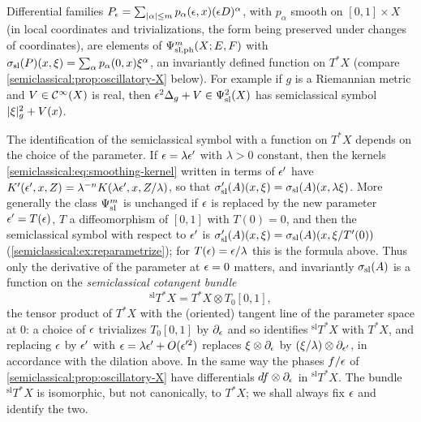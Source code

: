 Differential families
$P_\epsilon=\sum_{\lvert \alpha\rvert\le m}p_\alpha(\epsilon,x)(\epsilon D)^\alpha$, with $p_\alpha$ smooth
on $[0,1]\times X$ (in local coordinates and trivializations, the form being
preserved under changes of coordinates), are elements of $\Psi^{m}_{\mathrm{sl,ph}}(X;E,F)$
with $\sigma_{\mathrm{sl}}(P)(x,\xi)=\sum_\alpha p_\alpha(0,x)\xi^\alpha$, an invariantly defined
function on $T^*X$ (compare \cref{semiclassical:prop:oscillatory-X} below). For
example if $g$ is a Riemannian metric and $V\in\mathcal{C}^\infty(X)$ is real, then
$\epsilon^2\Delta_g+V\in\Psi^{2}_{\mathrm{sl}}(X)$ has semiclassical symbol $\lvert \xi\rvert^2_g+V(x)$.

\begin{remark}\label{semiclassical:rem:sl-cotangent}
  The identification of the semiclassical symbol with a function on $T^*X$ depends
  on the choice of the parameter. If $\epsilon=\lambda\epsilon'$ with $\lambda>0$
  constant, then the kernels \eqref{semiclassical:eq:smoothing-kernel} written in
  terms of $\epsilon'$ have $K'(\epsilon',x,Z)=\lambda^{-n}K(\lambda\epsilon',x,Z/\lambda)$, so that
  $\sigma_{\mathrm{sl}}'(A)(x,\xi)=\sigma_{\mathrm{sl}}(A)(x,\lambda\xi)$. More generally the class $\Psi^{m}_{\mathrm{sl}}$ is
  unchanged if $\epsilon$ is replaced by the new parameter $\epsilon'=T(\epsilon)$, $T$ a diffeomorphism of $[0,1]$
  with $T(0)=0$, and then the semiclassical symbol with respect to $\epsilon'$ is
  $\sigma_{\mathrm{sl}}'(A)(x,\xi)=\sigma_{\mathrm{sl}}(A)(x,\xi/T'(0))$
  (\cref{semiclassical:ex:reparametrize}); for $T(\epsilon)=\epsilon/\lambda$ this is the
  formula above. Thus only the derivative of the
  parameter at $\epsilon=0$ matters, and invariantly $\sigma_{\mathrm{sl}}(A)$ is a function on the
  \emph{semiclassical cotangent bundle}
  \begin{equation*}
    {}^{\mathrm{sl}}T^*X=T^*X\otimes T_0[0,1],
  \end{equation*}
  the tensor product of $T^*X$ with the (oriented) tangent line of the parameter
  space at $0$: a choice of $\epsilon$ trivializes $T_0[0,1]$ by $\partial_\epsilon$ and so
  identifies ${}^{\mathrm{sl}}T^*X$ with $T^*X$, and replacing $\epsilon$ by $\epsilon'$ with
  $\epsilon=\lambda\epsilon'+O(\epsilon'^2)$ replaces $\xi\otimes\partial_\epsilon$ by
  $(\xi/\lambda)\otimes\partial_{\epsilon'}$, in accordance with the dilation above. In the same
  way the phases $f/\epsilon$ of \cref{semiclassical:prop:oscillatory-X} have
  differentials $df\otimes\partial_\epsilon$ in ${}^{\mathrm{sl}}T^*X$. The bundle
  ${}^{\mathrm{sl}}T^*X$ is isomorphic, but not canonically, to $T^*X$; we shall
  always fix $\epsilon$ and identify the two.
\end{remark}

